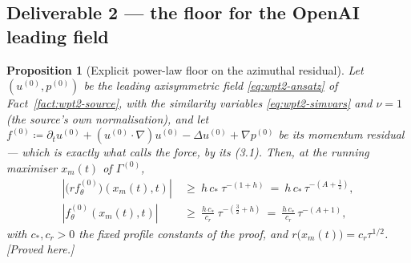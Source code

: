 \documentclass[11pt]{article}
\newtheorem{proposition}[theorem]{Proposition}
\theoremstyle{definition}
\theoremstyle{remark}
\newcommand{\abs}[1]{\left|#1\right|}
\newcommand{\grad}{\nabla}
\begin{document}
\subsection{Deliverable 2 --- the floor for the OpenAI leading field}
\label{subsec:wpt3-floor}

\begin{proposition}[Explicit power-law floor on the azimuthal residual]
  \label{prop:wpt3-floor}
  Let $(u^{(0)},p^{(0)})$ be the leading axisymmetric field
  \eqref{eq:wpt2-ansatz} of Fact~\ref{fact:wpt2-source}, with the similarity
  variables \eqref{eq:wpt2-simvars} and $\nu=1$ (the source's own
  normalisation), and let
  $f^{(0)}\coloneqq\partial_tu^{(0)}+(u^{(0)}\cdot\grad)u^{(0)}
   -\Delta u^{(0)}+\grad p^{(0)}$
  be its momentum residual --- which is exactly what \cite{OpenAI2026} calls
  the force, by its (3.1). Then, at the running maximiser $x_m(t)$ of
  $\Gamma^{(0)}$,
  \begin{align}
    \abs{\bigl(rf^{(0)}_\theta\bigr)(x_m(t),t)}
      &\ \geq\ h\,c_*\ \tau^{-(1+h)}
      \ =\ h\,c_*\,\tau^{-(A+\frac12)} ,
      \label{eq:wpt3-floorA}\\[2pt]
    \abs{f^{(0)}_\theta(x_m(t),t)}
      &\ \geq\ \frac{h\,c_*}{c_r}\ \tau^{-(\frac32+h)}
      \ =\ \frac{h\,c_*}{c_r}\,\tau^{-(A+1)} ,
      \label{eq:wpt3-floorB}
  \end{align}
  with $c_*,c_r>0$ the fixed profile constants of the proof, and
  $r\bigl(x_m(t)\bigr)=c_r\tau^{1/2}$.
  \emph{[Proved here.]}
\end{proposition}
\end{document}
